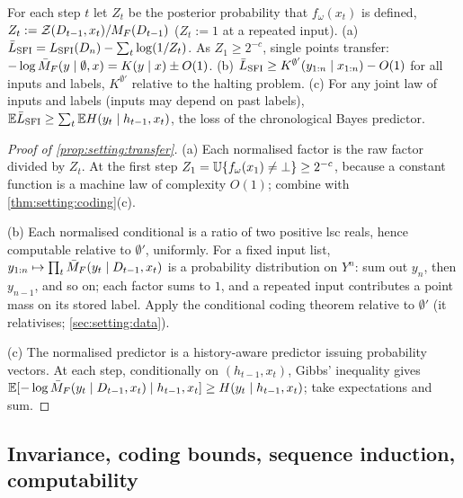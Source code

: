 \begin{proposition}\label{prop:setting:transfer}
For each step $t$ let $Z_t$ be the posterior probability that $f_\omega(x_t)$ is defined, $Z_t:=\mathcal{Z}(D_{t-1},x_t)/M_{F}(D_{t-1})$ ($Z_t:=1$ at a repeated input).
(a) $\bar{L}_{\mathrm{SFI}}=L_{\mathrm{SFI}}(D_n)-\sum_t\log(1/Z_t)$. As $Z_1\ge2^{-c}$, single points transfer: $-\log\bar{M}_{F}(y\mid\emptyset,x)=K(y\mid x)\pm O(1)$.
(b) $\bar{L}_{\mathrm{SFI}}\ge K^{\emptyset'}(y_{1:n}\mid x_{1:n})-O(1)$ for all inputs and labels, $K^{\emptyset'}$ relative to the halting problem.
(c) For any joint law of inputs and labels (inputs may depend on past labels), $\mathbb{E}\bar{L}_{\mathrm{SFI}}\ge\sum_t\mathbb{E} H(y_t\mid h_{t-1},x_t)$, the loss of the chronological Bayes predictor.
\end{proposition}

\begin{proof}[Proof of \cref{prop:setting:transfer}]
(a) Each normalised factor is the raw factor divided by $Z_t$. At the first step $Z_1=\mathbb{U}\{f_\omega(x_1)\ne\bot\}\ge2^{-c}$, because a constant function is a machine law of complexity $O(1)$; combine with \cref{thm:setting:coding}(c).

(b) Each normalised conditional is a ratio of two positive lsc reals, hence computable relative to $\emptyset'$, uniformly. For a fixed input list, $y_{1:n}\mapsto\prod_t\bar{M}_{F}(y_t\mid D_{t-1},x_t)$ is a probability distribution on $Y^n$: sum out $y_n$, then $y_{n-1}$, and so on; each factor sums to $1$, and a repeated input contributes a point mass on its stored label. Apply the conditional coding theorem relative to $\emptyset'$ (it relativises; \cref{sec:setting:data}).

(c) The normalised predictor is a history-aware predictor issuing probability vectors. At each step, conditionally on $(h_{t-1},x_t)$, Gibbs' inequality gives $\mathbb{E}[-\log\bar{M}_{F}(y_t\mid D_{t-1},x_t)\mid h_{t-1},x_t]\ge H(y_t\mid h_{t-1},x_t)$; take expectations and sum.
\end{proof}

\subsection{Invariance, coding bounds, sequence induction, computability}\label{app:setting:basic}

